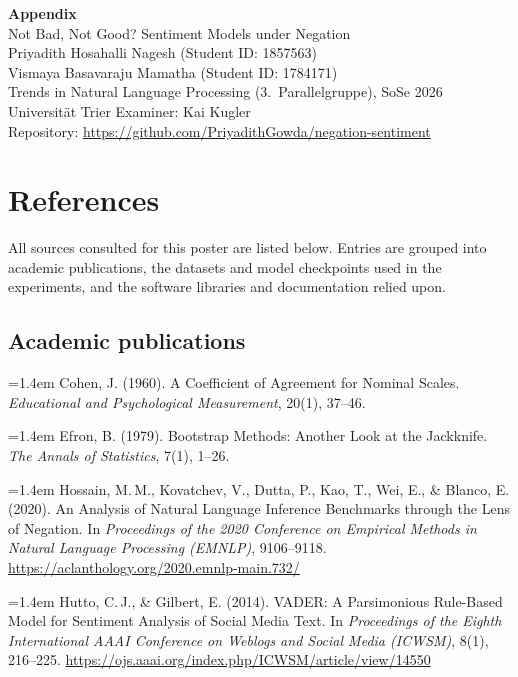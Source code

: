 \documentclass[11pt,a4paper]{article}
\newcommand{\refitem}[1]{\par\noindent\hangindent=1.4em\hangafter=1 #1\par\vspace{0.45em}}
\begin{document}
\begin{center}
{\LARGE\bfseries\color{navy} Appendix}\\[0.6em]
{\large Not Bad, Not Good? Sentiment Models under Negation}\\[0.9em]
{\normalsize Priyadith Hosahalli Nagesh \quad(Student ID: 1857563)}\\[0.3em]
{\normalsize Vismaya Basavaraju Mamatha \quad(Student ID: 1784171)}\\[0.7em]
{\small Trends in Natural Language Processing (3.\ Parallelgruppe), SoSe 2026}\\
{\small Universit\"at Trier \quad\textbullet\quad Examiner: Kai Kugler}\\[0.5em]
{\small Repository: \url{https://github.com/PriyadithGowda/negation-sentiment}}
\end{center}

\vspace{0.8em}

\section{References}

All sources consulted for this poster are listed below. Entries are grouped into
academic publications, the datasets and model checkpoints used in the experiments,
and the software libraries and documentation relied upon.

\subsection*{Academic publications}

\refitem{Cohen, J. (1960). A Coefficient of Agreement for Nominal Scales. \emph{Educational and Psychological Measurement}, 20(1), 37--46.}

\refitem{Efron, B. (1979). Bootstrap Methods: Another Look at the Jackknife. \emph{The Annals of Statistics}, 7(1), 1--26.}

\refitem{Hossain, M.\,M., Kovatchev, V., Dutta, P., Kao, T., Wei, E., \& Blanco, E. (2020). An Analysis of Natural Language Inference Benchmarks through the Lens of Negation. In \emph{Proceedings of the 2020 Conference on Empirical Methods in Natural Language Processing (EMNLP)}, 9106--9118. \url{https://aclanthology.org/2020.emnlp-main.732/}}

\refitem{Hutto, C.\,J., \& Gilbert, E. (2014). VADER: A Parsimonious Rule-Based Model for Sentiment Analysis of Social Media Text. In \emph{Proceedings of the Eighth International AAAI Conference on Weblogs and Social Media (ICWSM)}, 8(1), 216--225. \url{https://ojs.aaai.org/index.php/ICWSM/article/view/14550}}
\end{document}
